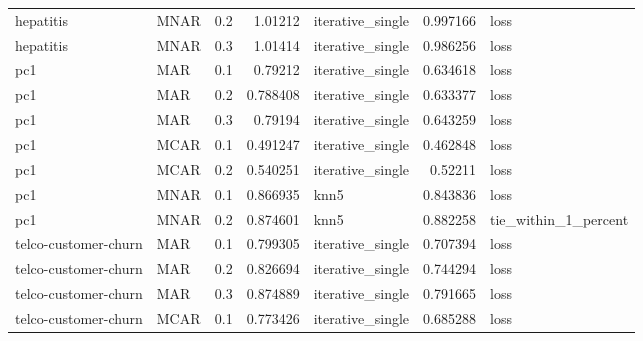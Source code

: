 \begin{table}[ht]
{\begin{tabular}{llrrlrl}
 hepatitis            & MNAR        &         0.2 &                          1.01212  & iterative\_single &                           0.997166 & loss                 \\
 hepatitis            & MNAR        &         0.3 &                          1.01414  & iterative\_single &                           0.986256 & loss                 \\
 pc1                  & MAR         &         0.1 &                          0.79212  & iterative\_single &                           0.634618 & loss                 \\
 pc1                  & MAR         &         0.2 &                          0.788408 & iterative\_single &                           0.633377 & loss                 \\
 pc1                  & MAR         &         0.3 &                          0.79194  & iterative\_single &                           0.643259 & loss                 \\
 pc1                  & MCAR        &         0.1 &                          0.491247 & iterative\_single &                           0.462848 & loss                 \\
 pc1                  & MCAR        &         0.2 &                          0.540251 & iterative\_single &                           0.52211  & loss                 \\
 pc1                  & MNAR        &         0.1 &                          0.866935 & knn5             &                           0.843836 & loss                 \\
 pc1                  & MNAR        &         0.2 &                          0.874601 & knn5             &                           0.882258 & tie\_within\_1\_percent \\
 telco-customer-churn & MAR         &         0.1 &                          0.799305 & iterative\_single &                           0.707394 & loss                 \\
 telco-customer-churn & MAR         &         0.2 &                          0.826694 & iterative\_single &                           0.744294 & loss                 \\
 telco-customer-churn & MAR         &         0.3 &                          0.874889 & iterative\_single &                           0.791665 & loss                 \\
 telco-customer-churn & MCAR        &         0.1 &                          0.773426 & iterative\_single &                           0.685288 & loss                 \\

\end{tabular}}
\end{table}
